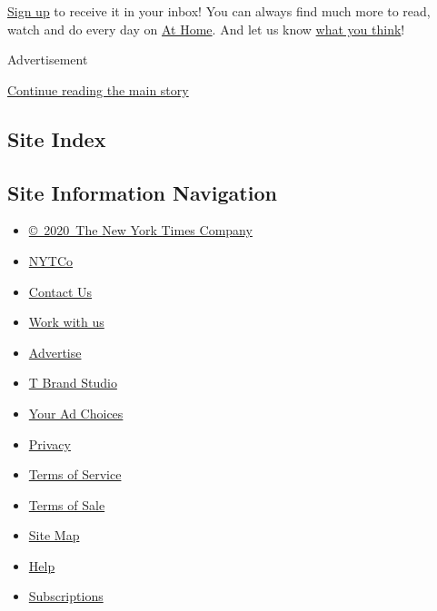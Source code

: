 \href{https://www.nytimes.com/newsletters/at-home}{Sign up} to receive
it in your inbox! You can always find much more to read, watch and do
every day on \href{https://www.nytimes.com/spotlight/at-home}{At Home}.
And let us know
\href{https://nyt.qualtrics.com/jfe/form/SV_e9cKGVFtci4CObz}{what you
think}!

Advertisement

\protect\hyperlink{after-bottom}{Continue reading the main story}

\hypertarget{site-index}{%
\subsection{Site Index}\label{site-index}}

\hypertarget{site-information-navigation}{%
\subsection{Site Information
Navigation}\label{site-information-navigation}}

\begin{itemize}
\tightlist
\item
  \href{https://help.nytimes.com/hc/en-us/articles/115014792127-Copyright-notice}{©~2020~The
  New York Times Company}
\end{itemize}

\begin{itemize}
\tightlist
\item
  \href{https://www.nytco.com/}{NYTCo}
\item
  \href{https://help.nytimes.com/hc/en-us/articles/115015385887-Contact-Us}{Contact
  Us}
\item
  \href{https://www.nytco.com/careers/}{Work with us}
\item
  \href{https://nytmediakit.com/}{Advertise}
\item
  \href{http://www.tbrandstudio.com/}{T Brand Studio}
\item
  \href{https://www.nytimes.com/privacy/cookie-policy\#how-do-i-manage-trackers}{Your
  Ad Choices}
\item
  \href{https://www.nytimes.com/privacy}{Privacy}
\item
  \href{https://help.nytimes.com/hc/en-us/articles/115014893428-Terms-of-service}{Terms
  of Service}
\item
  \href{https://help.nytimes.com/hc/en-us/articles/115014893968-Terms-of-sale}{Terms
  of Sale}
\item
  \href{https://spiderbites.nytimes.com}{Site Map}
\item
  \href{https://help.nytimes.com/hc/en-us}{Help}
\item
  \href{https://www.nytimes.com/subscription?campaignId=37WXW}{Subscriptions}
\end{itemize}
